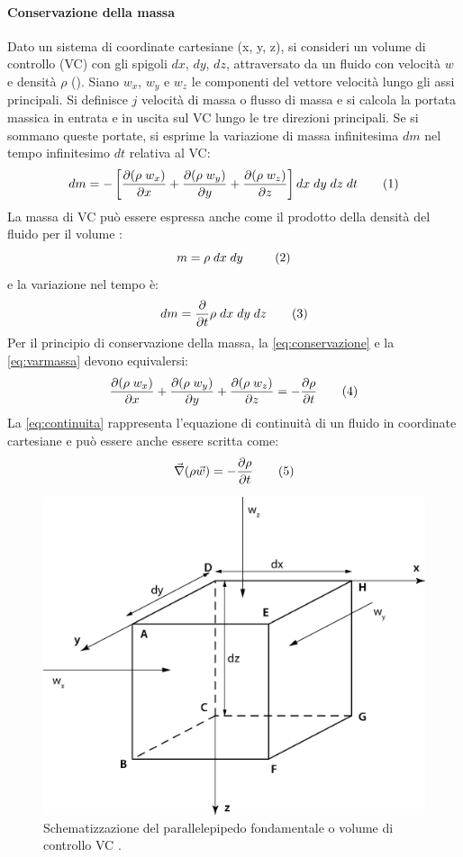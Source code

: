 \paragraph{Conservazione della massa}
Dato un sistema di coordinate cartesiane (x, y, z), si consideri un volume di controllo (VC) con gli spigoli \(dx\), \(dy\), \(dz\), attraversato da un fluido con velocità \(w\) e densità \(\rho\) (). Siano \(w_x\), \(w_y\) e \(w_z\) le componenti del vettore velocità lungo gli assi principali. Si definisce \(j\) velocità di massa o flusso di massa e si calcola la portata massica in entrata e in uscita sul VC lungo le tre direzioni principali. Se si sommano queste portate, si esprime la variazione di massa infinitesima \(dm\) nel tempo infinitesimo \(dt\) relativa al VC:
\[dm= - \left[\dfrac{\partial(\rho \; w_x)}{\partial x} + \dfrac{\partial(\rho \; w_y)}{\partial y} + \dfrac{\partial(\rho \; w_z)}{\partial z} \right]dx \; dy \; dz \; dt \label{eq:conservazione} \addtag \]
La massa di VC può essere espressa anche come il prodotto della densità del fluido per il volume :
\[m= \rho \; dx \; dy \; \label{eq:massa}\ \addtag \]
e la variazione nel tempo è:
\[dm = \dfrac{\partial}{\partial t}\rho \; dx \; dy \; dz \label{eq:varmassa} \addtag \]
Per il principio di conservazione della massa, la \eqref{eq:conservazione} e la \eqref{eq:varmassa} devono equivalersi:
\[\dfrac{\partial(\rho \; w_x)}{\partial x} + \dfrac{\partial(\rho \; w_y)}{\partial y} + \dfrac{\partial(\rho \; w_z)}{\partial z}= - \dfrac{\partial \rho}{\partial t} \addtag \label{eq:continuita} \]
La \eqref{eq:continuita} rappresenta l'equazione di continuità di un fluido in coordinate cartesiane e può essere anche essere scritta come:
\[ \vec{\nabla} (\rho \vec{w}) = -\dfrac{\partial \rho}{\partial t} \addtag \label{eq:continuitadiff} \]

\begin{figure}[htbp] 
    \centering
    \includegraphics[width=.5\textwidth]{fig/fluidodinamica/cv.eps}
    \caption{Schematizzazione del parallelepipedo fondamentale o volume di controllo VC \parencite{chierici1989principi}.} 
    \label{fig:vc}
\end{figure}

